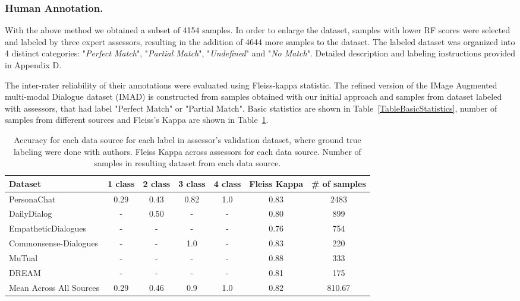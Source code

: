 \subsubsection{Human Annotation.}

With the above method we obtained a subset of 4154 samples. In order to enlarge the dataset, samples with lower RF scores were selected and labeled by three expert assessors, resulting in the addition of 4644 more samples to the dataset. The labeled dataset was organized into 4 distinct categories: "\textit{Perfect Match}", "\textit{Partial Match}", "\textit{Undefined}" and "\textit{No Match}". Detailed description and labeling instructions provided  in Appendix D.

\smallskip

The inter-rater reliability of their annotations were evaluated using Fleiss-kappa statistic. The refined version of the IMage Augmented multi-modal Dialogue dataset (IMAD) is constructed from samples obtained with our initial approach and samples from dataset labeled with assessors, that had label "Perfect Match" or "Partial Match". Basic statistics are shown in Table~\ref{TableBasicStatistics}, number of samples from different sources and Fleiss's Kappa are shown in Table~\ref{TableAccuracies}.


\begin{table}
\caption{Accuracy for each data source for each label in assessor's validation dataset, where ground true labeling were done with authors. Fleiss Kappa across assessors for each data source. Number of samples in resulting dataset from each data source.}
\label{TableAccuracies} 
\begin{center}
\tabcolsep=0.11cm
\begin{tabular}{l|cccc|c|c}
\hline
Dataset &    1 class &     2 class &     3 class &    4 class & Fleiss Kappa & \# of samples\\
\hline
PersonaChat         &  0.29 &  0.43 &  0.82 &  1.0 & 0.83 & 2483  \\
DailyDialog        & - &  0.50 & - & - & 0.80 & 899 \\
EmpatheticDialogues   & - & - & - & - & 0.76 & 754 \\
Commonsense-Dialogues & - & - &  1.0 & - & 0.83 & 220\\
MuTual        & - & - & - & - & 0.88 & 333\\
DREAM        & - & - & - & - & 0.81 & 175 \\
\hline
Mean Across All Sources & 0.29 & 0.46 & 0.9 & 1.0 & 0.82 & 810.67 \\
\hline
\end{tabular}
\end{center}

\end{table}



